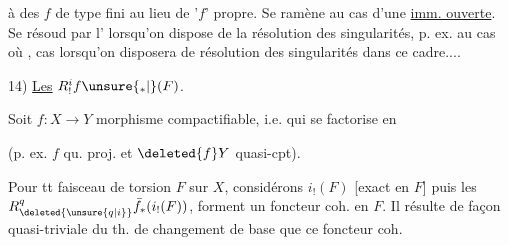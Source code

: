 à des $f$ de type fini au lieu de '$f$' propre. Se ramène au cas d'une \uline{imm. ouverte}. Se résoud par l' lorsqu'on dispose de la résolution des singularités, p. ex. au cas où ,   cas lorsqu'on disposera de résolution des singularités  dans ce cadre....

14) \uline{Les} $R^{i}_{!}f\unsure{{}_{*}|{}}(F)$.

Soit $f:X\longrightarrow Y$ morphisme compactifiable, i.e. qui se factorise en


(p. ex. $f$ qu. proj. et $\deleted{f}Y$ quasi-cpt).

Pour tt faisceau de torsion $F$ sur $X$, considérons $i_!(F)$ [exact en $F$] puis les $R^{q}_{\deleted{\unsure{q|i}}}\bar f_*(i_!(F))$, forment un foncteur coh. en $F$. Il résulte de façon quasi-triviale du th. de changement de base que ce foncteur coh.

